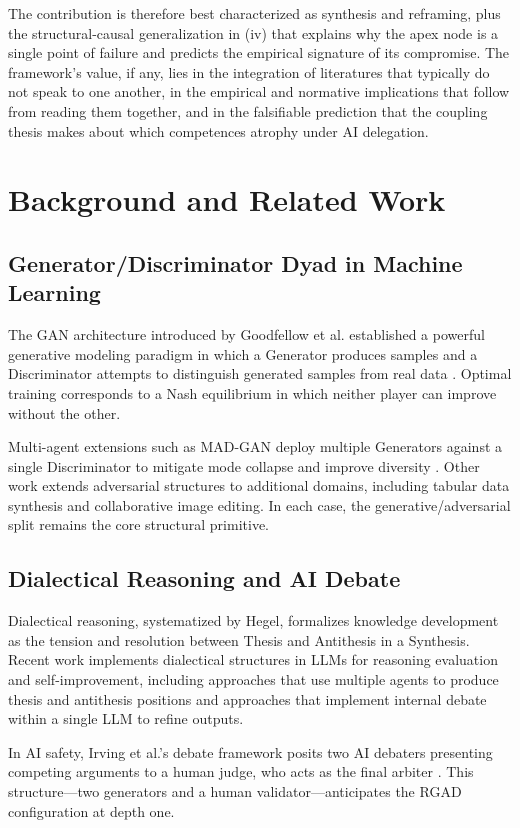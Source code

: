 \documentclass[11pt,a4paper]{article}
\begin{document}
The contribution is therefore best characterized as synthesis and reframing, plus the structural-causal generalization in (iv) that explains why the apex node is a single point of failure and predicts the empirical signature of its compromise. The framework's value, if any, lies in the integration of literatures that typically do not speak to one another, in the empirical and normative implications that follow from reading them together, and in the falsifiable prediction that the coupling thesis makes about which competences atrophy under AI delegation.

\section{Background and Related Work}

\subsection{Generator/Discriminator Dyad in Machine Learning}
The GAN architecture introduced by Goodfellow et al. established a powerful generative modeling paradigm in which a Generator produces samples and a Discriminator attempts to distinguish generated samples from real data \citep{goodfellow2014}. Optimal training corresponds to a Nash equilibrium in which neither player can improve without the other.

Multi-agent extensions such as MAD-GAN deploy multiple Generators against a single Discriminator to mitigate mode collapse and improve diversity \citep{ghosh2018}. Other work extends adversarial structures to additional domains, including tabular data synthesis and collaborative image editing. In each case, the generative/adversarial split remains the core structural primitive.

\subsection{Dialectical Reasoning and AI Debate}
Dialectical reasoning, systematized by Hegel, formalizes knowledge development as the tension and resolution between Thesis and Antithesis in a Synthesis. Recent work implements dialectical structures in LLMs for reasoning evaluation and self-improvement, including approaches that use multiple agents to produce thesis and antithesis positions and approaches that implement internal debate within a single LLM to refine outputs.

In AI safety, Irving et al.'s debate framework posits two AI debaters presenting competing arguments to a human judge, who acts as the final arbiter \citep{irving2018}. This structure---two generators and a human validator---anticipates the RGAD configuration at depth one.
\end{document}
